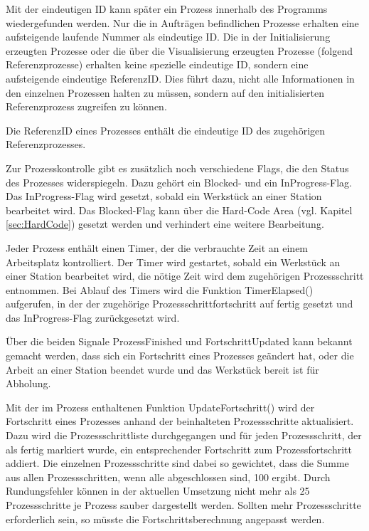 Mit der eindeutigen ID kann später ein Prozess innerhalb des Programms wiedergefunden werden. Nur die in Aufträgen befindlichen Prozesse erhalten eine aufsteigende laufende Nummer als eindeutige ID. Die in der Initialisierung erzeugten Prozesse oder die über die Visualisierung erzeugten Prozesse (folgend Referenzprozesse) erhalten keine spezielle eindeutige ID, sondern eine aufsteigende eindeutige ReferenzID. Dies führt dazu, nicht alle Informationen in den einzelnen Prozessen halten zu müssen, sondern auf den initialisierten Referenzprozess zugreifen zu können. 

Die ReferenzID eines Prozesses enthält die eindeutige ID des zugehörigen Referenzprozesses. 

Zur Prozesskontrolle gibt es zusätzlich noch verschiedene Flags, die den Status des Prozesses widerspiegeln. Dazu gehört ein Blocked- und ein InProgress-Flag. Das InProgress-Flag wird gesetzt, sobald ein Werkstück an einer Station bearbeitet wird. Das Blocked-Flag kann über die Hard-Code Area (vgl. Kapitel \ref{sec:HardCode}) gesetzt werden und verhindert eine weitere Bearbeitung. 

Jeder Prozess enthält einen Timer, der die verbrauchte Zeit an einem Arbeitsplatz kontrolliert. Der Timer wird gestartet, sobald ein Werkstück an einer Station bearbeitet wird, die nötige Zeit wird dem zugehörigen Prozessschritt entnommen. Bei Ablauf des Timers wird die Funktion TimerElapsed() aufgerufen, in der der zugehörige Prozessschrittfortschritt auf fertig gesetzt und das InProgress-Flag zurückgesetzt wird. 

Über die beiden Signale ProzessFinished und FortschrittUpdated kann bekannt gemacht werden, dass sich ein Fortschritt eines Prozesses geändert hat, oder die Arbeit an einer Station beendet wurde und das Werkstück bereit ist für Abholung.

Mit der im Prozess enthaltenen Funktion UpdateFortschritt() wird der Fortschritt eines Prozesses anhand der beinhalteten Prozessschritte aktualisiert. Dazu wird die Prozessschrittliste durchgegangen und für jeden Prozessschritt, der als fertig markiert wurde, ein entsprechender Fortschritt zum Prozessfortschritt addiert. Die einzelnen Prozessschritte sind dabei so gewichtet, dass die Summe aus allen Prozessschritten, wenn alle abgeschlossen sind, 100 ergibt. Durch Rundungsfehler können in der aktuellen Umsetzung nicht mehr als 25 Prozessschritte je Prozess sauber dargestellt werden. Sollten mehr Prozessschritte erforderlich sein, so müsste die Fortschrittsberechnung angepasst werden.

